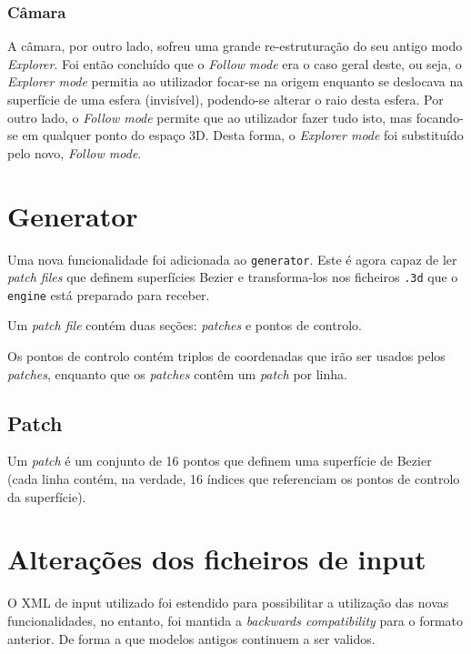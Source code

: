 \documentclass[a4paper]{article}
\begin{document}

\subsubsection{Câmara}

A câmara, por outro lado, sofreu uma grande re-estruturação do seu antigo modo \textit{Explorer}.
Foi então concluído que o \textit{Follow mode} era o caso geral deste, ou seja, o \textit{Explorer mode}
permitia ao utilizador focar-se na origem enquanto se deslocava na superfície de uma esfera (invisível), podendo-se alterar o raio desta esfera. Por outro lado, o \textit{Follow mode} permite
que ao utilizador fazer tudo isto, mas focando-se em qualquer ponto do espaço 3D. Desta forma, o \textit{Explorer mode} foi substituído pelo novo, \textit{Follow mode}.

\section{Generator}

Uma nova funcionalidade foi adicionada ao \texttt{generator}. Este é agora capaz de ler \textit{patch files} que definem superfícies Bezier e transforma-los nos ficheiros \texttt{.3d} que o \texttt{engine} está preparado para receber.

Um \textit{patch file} contém duas seções: \textit{patches} e pontos de controlo.

Os pontos de controlo contém triplos de coordenadas que irão ser usados pelos \textit{patches}, enquanto que os \textit{patches} contêm um \textit{patch} por linha.

\subsection{Patch}

Um \textit{patch} é um conjunto de 16 pontos que definem uma superfície de Bezier (cada linha contém, na verdade, 16 índices que referenciam os pontos de controlo da superfície).


\section{Alterações dos ficheiros de input}\label{sec:estrutura-ficheiros}

O XML de input utilizado foi estendido para possibilitar a utilização das novas funcionalidades, no entanto, foi mantida a \textit{backwards compatibility} para o formato anterior. De forma a que modelos antigos continuem a ser validos.
\end{document}
